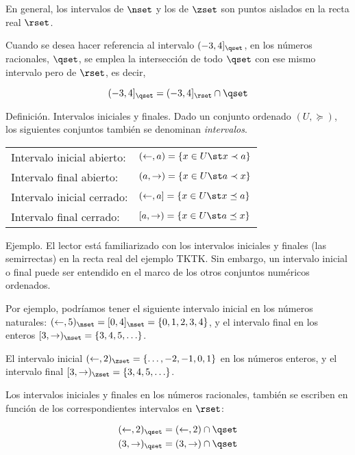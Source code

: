 En general, los intervalos de $\nset$ y los de $\zset$ son puntos aislados
en la recta real $\rset$.

Cuando se desea hacer referencia al intervalo $({-3}, 4]_\qset$, en los
números racionales, $\qset$, se emplea la intersección de todo $\qset$ con
ese mismo intervalo pero de $\rset$, es decir,

$$ ({-3}, 4]_\qset = ({-3}, 4]_\rset \cap \qset $$

Definición. Intervalos iniciales y finales. Dado un conjunto ordenado $(U,
\succeq)$, los siguientes conjuntos también se denominan \emph{intervalos}.

\begin{center}
\begin{tabular}{l@{\quad}l}
  Intervalo inicial abierto:
    & $\displaystyle (\leftarrow, a) = \{x \in U \st x \prec a\}$ \\
  Intervalo final abierto:
    & $\displaystyle (a, \rightarrow) = \{x \in U \st a \prec x\}$ \\
  Intervalo inicial cerrado:
    & $\displaystyle (\leftarrow, a] = \{x \in U \st x \preceq a\}$ \\
  Intervalo final cerrado:
    & $\displaystyle [a, \rightarrow) = \{x \in U \st a \preceq x\}$ \\
\end{tabular}
\end{center}

Ejemplo. El lector está familiarizado con los intervalos iniciales y finales
(las semirrectas) en la recta real del ejemplo TKTK. Sin embargo, un
intervalo inicial o final puede ser entendido en el marco de los otros
conjuntos numéricos ordenados.

Por ejemplo, podríamos tener el siguiente intervalo inicial en los números
naturales: $(\leftarrow, 5)_\nset = [0, 4]_\nset = \{0, 1, 2, 3, 4\}$, y el
intervalo final en los enteros $[3, \rightarrow)_\nset = \{3, 4, 5,
\ldots\}$.

El intervalo inicial $(\leftarrow, 2)_\zset = \{\ldots, {-2}, {-1}, 0, 1\}$
en los números enteros, y el intervalo final $[3, \rightarrow)_\zset = \{3,
4, 5, \ldots\}$.

Los intervalos iniciales y finales en los números racionales, también se
escriben en función de los correspondientes intervalos en $\rset$:

\begin{align*}
  (\leftarrow, 2)_\qset = (\leftarrow, 2) \cap \qset \\
  (3, \rightarrow)_\qset = (3, \rightarrow) \cap \qset \\
\end{align*}

